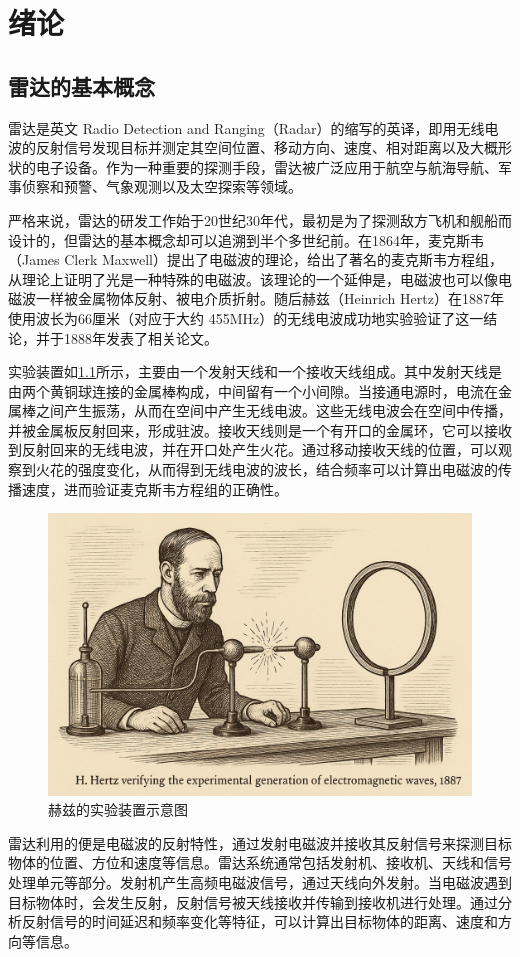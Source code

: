 \chapter{绪论}
\label{chp1}

\section{雷达的基本概念}
雷达是英文 Radio Detection and Ranging（Radar）的缩写的英译，即用无线电波的反射信号发现目标并测定其空间位置、移动方向、速度、相对距离以及大概形状的电子设备。作为一种重要的探测手段，雷达被广泛应用于航空与航海导航、军事侦察和预警、气象观测以及太空探索等领域。

严格来说，雷达的研发工作始于20世纪30年代，最初是为了探测敌方飞机和舰船而设计的，但雷达的基本概念却可以追溯到半个多世纪前。在1864年，麦克斯韦（James Clerk Maxwell）提出了电磁波的理论，给出了著名的麦克斯韦方程组，从理论上证明了光是一种特殊的电磁波。该理论的一个延伸是，电磁波也可以像电磁波一样被金属物体反射、被电介质折射。随后赫兹（Heinrich Hertz）在1887年使用波长为66厘米（对应于大约 455MHz）的无线电波成功地实验验证了这一结论，并于1888年发表了相关论文。

实验装置如\cref{fig_chp1_hertz}所示，主要由一个发射天线和一个接收天线组成。其中发射天线是由两个黄铜球连接的金属棒构成，中间留有一个小间隙。当接通电源时，电流在金属棒之间产生振荡，从而在空间中产生无线电波。这些无线电波会在空间中传播，并被金属板反射回来，形成驻波。接收天线则是一个有开口的金属环，它可以接收到反射回来的无线电波，并在开口处产生火花。通过移动接收天线的位置，可以观察到火花的强度变化，从而得到无线电波的波长，结合频率可以计算出电磁波的传播速度，进而验证麦克斯韦方程组的正确性。

\begin{figure}[htb!]
    \centering
    \includegraphics[width=.6\textwidth]{./img/chp1/hertz_experiment.png}
    \caption{赫兹的实验装置示意图}
    \label{fig_chp1_hertz}
\end{figure}

雷达利用的便是电磁波的反射特性，通过发射电磁波并接收其反射信号来探测目标物体的位置、方位和速度等信息。雷达系统通常包括发射机、接收机、天线和信号处理单元等部分。发射机产生高频电磁波信号，通过天线向外发射。当电磁波遇到目标物体时，会发生反射，反射信号被天线接收并传输到接收机进行处理。通过分析反射信号的时间延迟和频率变化等特征，可以计算出目标物体的距离、速度和方向等信息。

